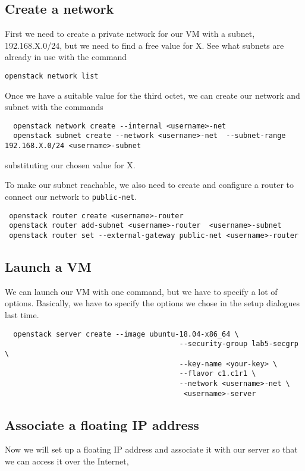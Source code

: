 \documentclass{article}
\begin{document}
\subsection{Create a network}
First we need to create a private network for our VM with a subnet, 192.168.X.0/24, but we need to find a free value for X. See what subnets are already in use with the command

 \texttt{openstack network list}
 
 Once we have a suitable value for the third octet, we can create our network and subnet with the commands

\begin{verbatim}
  openstack network create --internal <username>-net
  openstack subnet create --network <username>-net  --subnet-range 192.168.X.0/24 <username>-subnet
\end{verbatim}

substituting our chosen value for X.

To make our subnet reachable, we also need to create and configure a router to connect our network to \texttt{public-net}.

\begin{verbatim}
 openstack router create <username>-router
 openstack router add-subnet <username>-router  <username>-subnet
 openstack router set --external-gateway public-net <username>-router
\end{verbatim}

\subsection{Launch a VM}
We can launch our VM with one command, but we have to specify a lot of options. Basically, we have to specify the options we chose in the setup dialogues last time.

\begin{verbatim}
  openstack server create --image ubuntu-18.04-x86_64 \
                                         --security-group lab5-secgrp \
                                         --key-name <your-key> \
                                         --flavor c1.c1r1 \
                                         --network <username>-net \
                                          <username>-server
\end{verbatim}

\subsection{Associate a floating IP address}
Now we will set up a floating IP address and associate it with our server so that we can access it over the Internet,
\end{document}
